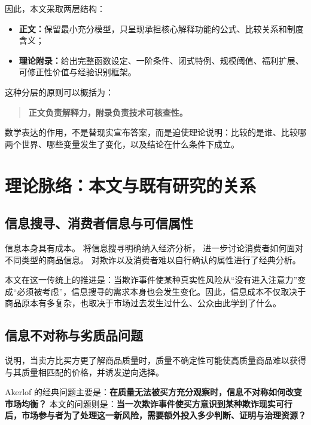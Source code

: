 \documentclass[UTF8,12pt]{ctexart}
\begin{document}
因此，本文采取两层结构：

\begin{itemize}[leftmargin=2.2em]
  \item \textbf{正文：}保留最小充分模型，只呈现承担核心解释功能的公式、比较关系和制度含义；
  \item \textbf{理论附录：}给出完整函数设定、一阶条件、闭式特例、规模阈值、福利扩展、可修正性价值与经验识别框架。
\end{itemize}

这种分层的原则可以概括为：

\begin{quote}
\textbf{正文负责解释力，附录负责技术可核查性。}
\end{quote}

数学表达的作用，不是替现实宣布答案，而是迫使理论说明：比较的是谁、比较哪两个世界、哪些变量发生了变化，以及结论在什么条件下成立。

\section{理论脉络：本文与既有研究的关系}

\subsection{信息搜寻、消费者信息与可信属性}

信息本身具有成本。\citet{stigler1961information} 将信息搜寻明确纳入经济分析，\citet{nelson1970consumer} 进一步讨论消费者如何面对不同类型的商品信息。\citet{darbykarni1973fraud} 对欺诈以及消费者难以自行确认的属性进行了经典分析。

本文在这一传统上的推进是：当欺诈事件使某种真实性风险从“没有进入注意力”变成“必须被考虑”，信息搜寻的需求本身也会发生变化。因此，信息成本不仅取决于商品原本有多复杂，也取决于市场过去发生过什么、公众由此学到了什么。

\subsection{信息不对称与劣质品问题}

\citet{akerlof1970lemons} 说明，当卖方比买方更了解商品质量时，质量不确定性可能使高质量商品难以获得与其质量相匹配的价格，并诱发逆向选择。

Akerlof 的经典问题主要是：\textbf{在质量无法被买方充分观察时，信息不对称如何改变市场均衡？} 本文的问题则是：\textbf{当一次欺诈事件使买方意识到某种欺诈现实可行后，市场参与者为了处理这一新风险，需要额外投入多少判断、证明与治理资源？}
\end{document}
